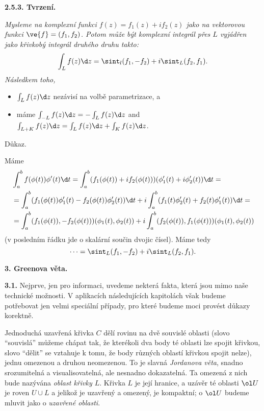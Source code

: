 \documentclass[12pt]{article}
\begin{document}
{\bf 2.5.3. Tvrzení.} {\em Mysleme na komplexní funkci 
$f(z)=f_1(z)+if_2(z)$ jako na vektorovou funkci $\ve{f}=(f_1,f_2)$. Potom může být komplexní integrál přes $L$ vyjádřen jako křivkobý integrál druhého druhu takto:
$$
\int_Lf(z)\d z=\sint_l(f_1,-f_2)+i\sint_L(f_2,f_1).
$$
Následkem toho, 
\begin{itemize}
\item $\int_Lf(z)\d z$ nezávisí na volbě parametrizace, a
\item máme $\int_{-L}f(z)\d z=-\int_Lf(z)\d z$ and $\int_{L+K}f(z)\d z=\int_Lf(z)\d z+\int_Kf(z)\d z$.
\end{itemize}

Důkaz.}  Máme
$$
\begin{aligned}
&\int_a^bf(\phi(t))\phi'(t)\d t=
\int_a^b(f_1(\phi(t))+if_2(\phi(t)))(\phi_1'(t)+i\phi_2'(t))\d t=\\
&=\int_a^b(f_1(\phi(t))\phi'_1(t)-f_2(\phi(t))\phi'_2(t))\d t+
i\int_a^b(f_1(t)\phi'_2(t)+f_2(t)\phi'_1(t))\d t=\\
&=\int_a^b(f_1(\phi(t)),-f_2(\phi(t)))(\phi_1(t),\phi_2(t))+
i\int_a^b(f_2(\phi(t)),f_1(\phi(t)))(\phi_1(t),\phi_2(t))
\end{aligned}
$$
(v posledním řádku jde o skalární součin dvojic čísel). Máme tedy
$$
\dots=\sint_L(f_1,-f_2)+i\sint_L(f_2,f_1).
$$
\sq

\vskip10mm

 {\large\bf 3. Greenova věta.}

\bigskip

{\bf 3.1.} Nejprve, jen pro informaci, uvedeme nekterá fakta, která jsou mimo naše technické možnosti. 
V aplikacích následujících kapitolách však budeme potřebovat jen velmi speciální případy, pro které
budeme moci provést důkazy korektně.


\smallskip

Jednoduchá uzavřená křivka $C$ dělí rovinu na dvě souvislé oblasti (slovo ``souvislá'' můžeme chápat tak, že kterékoli dva body té oblasti lze spojit křivkou, slovo ``dělit'' se vztahuje k tomu, že body různých oblastí křivkou spojit nelze), jednu omezenou a druhou neomezenou. To je slavná {\em Jordanova věta}, snadno srozumitelná a
visualisovatelná, ale nesnadno dokazatelná. Ta omezená z nich bude nazývána
 {\em oblast křivky $L$}. Křivka $L$ je její hranice, a uzávěr  té oblasti  $\ol U$  je roven  $U\cup L$ a jelikož je uzavřený a omezený, je kompaktní; o $\ol U$ budeme mluvit jako o  {\em uzavřené oblasti}.

\medskip
\end{document}
